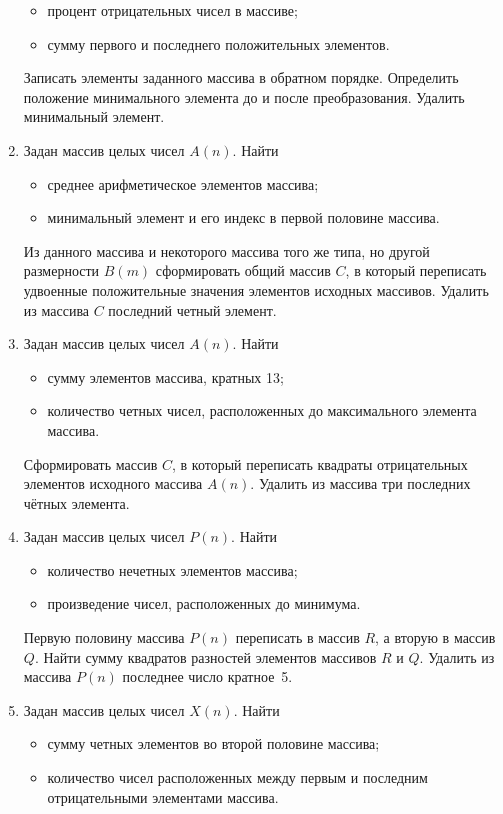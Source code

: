 \begin{enumerate}
\begin{itemize}
\item процент отрицательных чисел в массиве;
\item сумму первого и последнего положительных элементов.
\end{itemize}
Записать элементы заданного массива в обратном порядке. Определить положение минимального элемента до и после
преобразования. Удалить минимальный элемент.
\item Задан массив целых чисел $A(n)$. Найти
\begin{itemize}
\item среднее арифметическое элементов массива;
\item минимальный элемент и его индекс в первой половине массива.
\end{itemize}
Из данного массива и некоторого массива того же типа, но другой размерности $B(m)$
сформировать общий массив $C$, в который переписать удвоенные положительные значения элементов исходных
массивов. Удалить из массива $C$ последний четный элемент.
\item Задан массив целых чисел $A(n)$. Найти
\begin{itemize}
\item сумму элементов массива, кратных 13;
\item количество четных чисел, расположенных до максимального элемента массива.
\end{itemize}
Сформировать массив $C$, в который переписать квадраты отрицательных элементов исходного массива
$A(n)$. Удалить из массива три последних чётных элемента.
\item Задан массив целых чисел $P(n)$. Найти
\begin{itemize}
\item количество нечетных элементов массива;
\item произведение чисел, расположенных до минимума.
\end{itemize}
Первую половину массива $P(n)$ переписать в массив $R$, а вторую в
массив $Q$. Найти сумму квадратов разностей элементов массивов $R$ и
$Q$. Удалить из массива $P(n)$ последнее число кратное~5.
\item Задан массив целых чисел $X(n)$. Найти
\begin{itemize}
\item сумму четных элементов во второй половине массива;
\item количество чисел расположенных между первым и последним отрицательными элементами массива.
\end{itemize}

\end{enumerate}
